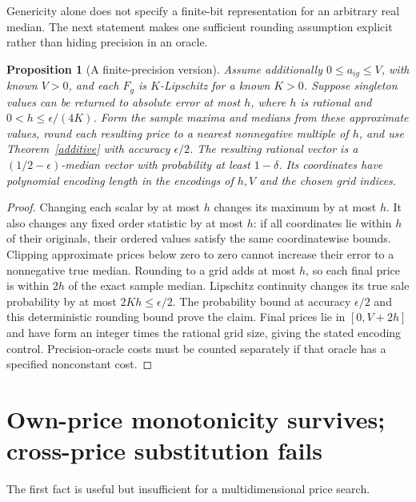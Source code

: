 \documentclass[11pt]{article}
\newtheorem{proposition}[theorem]{Proposition}
\theoremstyle{remark}
\begin{document}
Genericity alone does not specify a finite-bit representation for an
arbitrary real median. The next statement makes one sufficient
rounding assumption explicit rather than hiding precision in an oracle.

\begin{proposition}[A finite-precision version]\label{precision}
Assume additionally $0\leq a_{ig}\leq V$, with known $V>0$, and each
$F_g$ is $K$-Lipschitz for a known $K>0$. Suppose singleton values can
be returned to absolute error at most $h$, where $h$ is rational and
$0<h\leq\epsilon/(4K)$. Form the sample maxima and medians from these
approximate values, round each resulting price to a nearest nonnegative
multiple of $h$, and use Theorem~\ref{additive} with accuracy
$\epsilon/2$. The resulting rational vector is a
$(1/2-\epsilon)$-median vector with probability at least $1-\delta$.
Its coordinates have polynomial encoding length in the encodings of
$h,V$ and the chosen grid indices.
\end{proposition}
\begin{proof}
Changing each scalar by at most $h$ changes its maximum by at most $h$.
It also changes any fixed order statistic by at most $h$: if all
coordinates lie within $h$ of their originals, their ordered values
satisfy the same coordinatewise bounds. Clipping approximate prices
below zero to zero cannot increase their error to a nonnegative true
median. Rounding to a grid adds at most $h$, so each final price is
within $2h$ of the exact sample median. Lipschitz continuity changes
its true sale probability by at most $2Kh\leq\epsilon/2$.
The probability bound at accuracy $\epsilon/2$ and this deterministic
rounding bound prove the claim. Final prices lie in $[0,V+2h]$ and
have form an integer times the rational grid size, giving the stated
encoding control. Precision-oracle costs must be counted separately
if that oracle has a specified nonconstant cost.
\end{proof}

\section{Own-price monotonicity survives; cross-price substitution fails}
The first fact is useful but insufficient for a multidimensional price
search.
\end{document}
